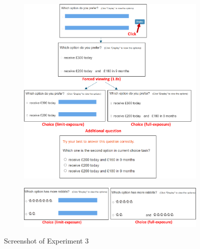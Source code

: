 \documentclass[
  12pt,
]{article}
\begin{document}
\begin{figure}
  \centering
  \begin{subfigure}{\textwidth}
    \centering
    \includegraphics[width=\linewidth]{figures/exp3_intertemporal_task.png}
  \end{subfigure}
  \begin{subfigure}{\textwidth}
    \vspace{2em}
    \centering
    \includegraphics[width=\linewidth]{figures/exp3_rabbit_task.png}
  \end{subfigure}
  \caption{Screenshot of Experiment 3}
  \label{fig:exp3_screenshot}
\end{figure}







\renewcommand\refname{Reference}
  
\end{document}
